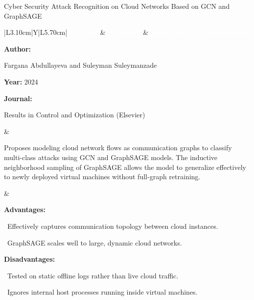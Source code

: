 \documentclass[aspectratio=169,10pt]{beamer}
\newcommand{\lrhdr}{%
  \rowcolor{prismNavy}%
  {\scriptsize\textcolor{white}{\textbf{Citation}}} &
  {\scriptsize\textcolor{white}{\textbf{Summary}}} &
  {\scriptsize\textcolor{white}{\textbf{Advantages \& Disadvantages}}} \\}
\begin{document}
\begin{frame}[t]{Cyber Security Attack Recognition on Cloud Networks Based on GCN and GraphSAGE}
\vspace{-0.30em}
{\footnotesize\setlength{\tabcolsep}{3.5pt}\renewcommand{\arraystretch}{1.10}
\begin{tabularx}{\textwidth}{|L{3.10cm}|Y|L{5.70cm}|}
\hline\lrhdr\hline
\begin{minipage}[t]{\linewidth}\fontsize{7.2pt}{9.2pt}\raggedright\selectfont
\textbf{Author:}\par
Fargana Abdullayeva and Suleyman Suleymanzade\par\vspace{4pt}
\textbf{Year:} 2024\par\vspace{4pt}
\textbf{Journal:}\par
Results in Control and Optimization (Elsevier)\par\vspace{4pt}
\end{minipage}
&
\begin{minipage}[t]{\linewidth}\fontsize{7.2pt}{9.2pt}\raggedright\selectfont
Proposes modeling cloud network flows as communication graphs to classify multi-class attacks using GCN and GraphSAGE models. The inductive neighborhood sampling of GraphSAGE allows the model to generalize effectively to newly deployed virtual machines without full-graph retraining.\par\vspace{4pt}
\end{minipage}
&
\begin{minipage}[t]{\linewidth}\fontsize{7.2pt}{9.0pt}\raggedright\selectfont
\textcolor{strengthGreen}{\textbf{Advantages:}}\par\vspace{1.5pt}
\textbullet~Effectively captures communication topology between cloud instances.\par\vspace{2.0pt}\textbullet~GraphSAGE scales well to large, dynamic cloud networks.\par\vspace{4.0pt}
\textcolor{limitRed}{\textbf{Disadvantages:}}\par\vspace{1.5pt}
\textbullet~Tested on static offline logs rather than live cloud traffic.\par\vspace{2.0pt}\textbullet~Ignores internal host processes running inside virtual machines.\par\vspace{4pt}
\end{minipage} \\\hline
\end{tabularx}}
\end{frame}
\end{document}
